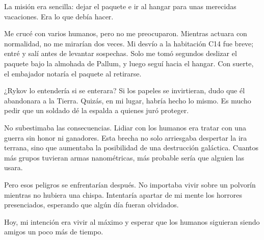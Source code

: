 La misión era sencilla: dejar el paquete e ir al hangar para unas merecidas vacaciones. Era lo que debía hacer.

Me crucé con varios humanos, pero no me preocuparon. Mientras actuara con normalidad, no me mirarían dos veces. Mi desvío a la habitación C14 fue breve; entré y salí antes de levantar sospechas. Solo me tomó segundos deslizar el paquete bajo la almohada de Pallum, y luego seguí hacia el hangar. Con suerte, el embajador notaría el paquete al retirarse.

¿Rykov lo entendería si se enterara? Si los papeles se invirtieran, dudo que él abandonara a la Tierra. Quizás, en mi lugar, habría hecho lo mismo. Es mucho pedir que un soldado dé la espalda a quienes juró proteger.

No subestimaba las consecuencias. Lidiar con los humanos era tratar con una guerra sin honor ni ganadores. Esta brecha no solo arriesgaba despertar la ira terrana, sino que aumentaba la posibilidad de una destrucción galáctica. Cuantos más grupos tuvieran armas nanométricas, más probable sería que alguien las usara.

Pero esos peligros se enfrentarían después. No importaba vivir sobre un polvorín mientras no hubiera una chispa. Intentaría apartar de mi mente los horrores presenciados, esperando que algún día fueran olvidados.

Hoy, mi intención era vivir al máximo y esperar que los humanos siguieran siendo amigos un poco más de tiempo.